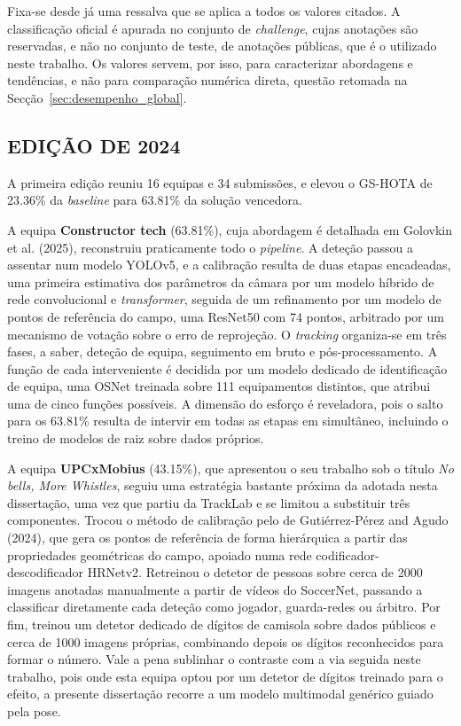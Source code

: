 Fixa-se desde já uma ressalva que se aplica a todos os valores citados. A classificação
oficial é apurada no conjunto de \emph{challenge}, cujas anotações são reservadas, e não
no conjunto de teste, de anotações públicas, que é o utilizado neste trabalho. Os valores
servem, por isso, para caracterizar abordagens e tendências, e não para comparação
numérica direta, questão retomada na Secção~\ref{sec:desempenho_global}.

\subsection{EDIÇÃO DE 2024}

A primeira edição reuniu 16 equipas e 34 submissões, e elevou o GS-HOTA de 23.36\% da
\emph{baseline} para 63.81\% da solução vencedora.

A equipa \textbf{Constructor tech} (63.81\%), cuja abordagem é detalhada em Golovkin et al.
(2025), reconstruiu praticamente todo o \emph{pipeline}. A deteção passou a assentar num
modelo YOLOv5, e a calibração resulta de duas etapas encadeadas, uma primeira estimativa
dos parâmetros da câmara por um modelo híbrido de rede convolucional e \emph{transformer},
seguida de um refinamento por um modelo de pontos de referência do campo, uma ResNet50 com
74 pontos, arbitrado por um mecanismo de votação sobre o erro de reprojeção. O
\emph{tracking} organiza-se em três fases, a saber, deteção de equipa, seguimento em bruto
e pós-processamento. A função de cada interveniente é decidida por um modelo dedicado de
identificação de equipa, uma OSNet treinada sobre 111 equipamentos distintos, que atribui
uma de cinco funções possíveis. A dimensão do esforço é reveladora, pois o salto para os
63.81\% resulta de intervir em todas as etapas em simultâneo, incluindo o treino de
modelos de raiz sobre dados próprios.

A equipa \textbf{UPCxMobius} (43.15\%), que apresentou o seu trabalho sob o título
\emph{No bells, More Whistles}, seguiu uma estratégia bastante próxima da adotada nesta
dissertação, uma vez que partiu da TrackLab e se limitou a substituir três componentes.
Trocou o método de calibração pelo de Gutiérrez-Pérez and Agudo (2024), que gera os pontos
de referência de forma hierárquica a partir das propriedades geométricas do campo, apoiado
numa rede codificador-descodificador HRNetv2. Retreinou o detetor de pessoas sobre cerca
de 2000 imagens anotadas manualmente a partir de vídeos do SoccerNet, passando a
classificar diretamente cada deteção como jogador, guarda-redes ou árbitro. Por fim,
treinou um detetor dedicado de dígitos de camisola sobre dados públicos e cerca de 1000
imagens próprias, combinando depois os dígitos reconhecidos para formar o número. Vale a
pena sublinhar o contraste com a via seguida neste trabalho, pois onde esta equipa optou
por um detetor de dígitos treinado para o efeito, a presente dissertação recorre a um
modelo multimodal genérico guiado pela pose.

